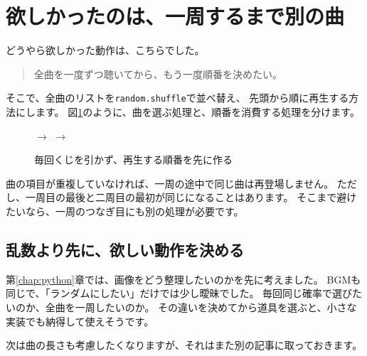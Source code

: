 \section{欲しかったのは、一周するまで別の曲}
どうやら欲しかった動作は、こちらでした。
\begin{quote}
  全曲を一度ずつ聴いてから、もう一度順番を決めたい。
\end{quote}
そこで、全曲のリストを\texttt{random.shuffle}で並べ替え、
先頭から順に再生する方法にします\cite{python:random}。
図\ref{fig:shuffle-bag}のように、曲を選ぶ処理と、順番を消費する処理を分けます。

\begin{figure}[htbp]
  \centering
  \enspace$\longrightarrow$\enspace
  \enspace$\longrightarrow$\enspace
  \caption{毎回くじを引かず、再生する順番を先に作る}
  \label{fig:shuffle-bag}
\end{figure}

曲の項目が重複していなければ、一周の途中で同じ曲は再登場しません。
ただし、一周目の最後と二周目の最初が同じになることはあります。
そこまで避けたいなら、一周のつなぎ目にも別の処理が必要です。

\subsection{乱数より先に、欲しい動作を決める}
第\ref{chap:python}章では、画像をどう整理したいのかを先に考えました。
BGMも同じで、「ランダムにしたい」だけでは少し曖昧でした。
毎回同じ確率で選びたいのか、全曲を一周したいのか。
その違いを決めてから道具を選ぶと、小さな実装でも納得して使えそうです。

次は曲の長さも考慮したくなりますが、それはまた別の記事に取っておきます。
